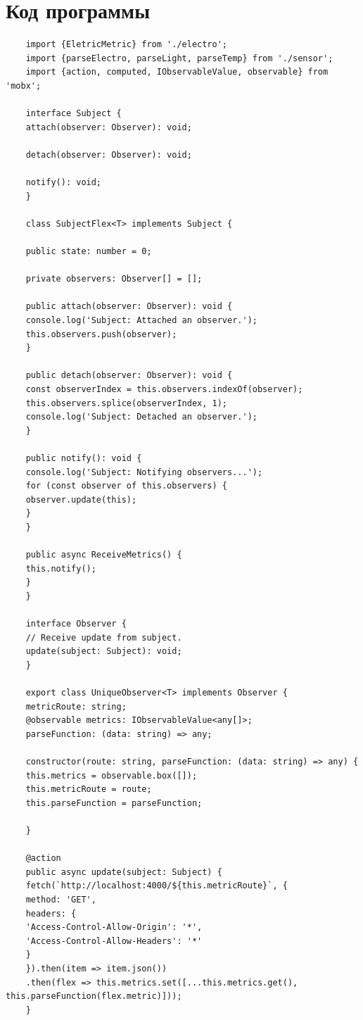 \documentclass[PI,LAB]{HSEUniversity}
\begin{document}
\section{Код программы}
\lstset{extendedchars=\true}
\begin{lstlisting}
    import {EletricMetric} from './electro';
    import {parseElectro, parseLight, parseTemp} from './sensor';
    import {action, computed, IObservableValue, observable} from 'mobx';
    
    interface Subject {
    attach(observer: Observer): void;
    
    detach(observer: Observer): void;
    
    notify(): void;
    }
    
    class SubjectFlex<T> implements Subject {
    
    public state: number = 0;
    
    private observers: Observer[] = [];
    
    public attach(observer: Observer): void {
    console.log('Subject: Attached an observer.');
    this.observers.push(observer);
    }
    
    public detach(observer: Observer): void {
    const observerIndex = this.observers.indexOf(observer);
    this.observers.splice(observerIndex, 1);
    console.log('Subject: Detached an observer.');
    }
    
    public notify(): void {
    console.log('Subject: Notifying observers...');
    for (const observer of this.observers) {
    observer.update(this);
    }
    }
    
    public async ReceiveMetrics() {
    this.notify();
    }
    }
    
    interface Observer {
    // Receive update from subject.
    update(subject: Subject): void;
    }
    
    export class UniqueObserver<T> implements Observer {
    metricRoute: string;
    @observable metrics: IObservableValue<any[]>;
    parseFunction: (data: string) => any;
    
    constructor(route: string, parseFunction: (data: string) => any) {
    this.metrics = observable.box([]);
    this.metricRoute = route;
    this.parseFunction = parseFunction;
    
    }
    
    @action
    public async update(subject: Subject) {
    fetch(`http://localhost:4000/${this.metricRoute}`, {
    method: 'GET',
    headers: {
    'Access-Control-Allow-Origin': '*',
    'Access-Control-Allow-Headers': '*'
    }
    }).then(item => item.json())
    .then(flex => this.metrics.set([...this.metrics.get(), this.parseFunction(flex.metric)]));
    }
    

\end{lstlisting}
\end{document}
